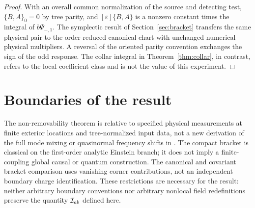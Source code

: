 \documentclass[11pt]{article}
\newcommand{\eps}{\varepsilon}
\begin{document}
\begin{proof}
With an overall common normalization of the source and detecting test, \(\{B,A\}_0=0\) by tree parity, and \([\eps]\{B,A\}\) is a nonzero constant times the integral of \(b\Psi_{-,1}\). The symplectic result of Section~\ref{sec:bracket} transfers the same physical pair to the order-reduced canonical chart with unchanged numerical physical multipliers. A reversal of the oriented parity convention exchanges the sign of the odd response. The collar integral in Theorem~\ref{thm:collar}, in contrast, refers to the local coefficient class and is not the value of this experiment.
\end{proof}

\section{Boundaries of the result}

The non-removability theorem is relative to specified physical measurements at finite exterior locations and tree-normalized input data, not a new derivation of the full mode mixing or quasinormal frequency shifts in \cite{Cano}. The compact bracket is classical on the first-order analytic Einstein branch; it does not imply a finite-coupling global causal or quantum construction. The canonical and covariant bracket comparison uses vanishing corner contributions, not an independent boundary charge identification. These restrictions are necessary for the result: neither arbitrary boundary conventions nor arbitrary nonlocal field redefinitions preserve the quantity \({\cal I}_{ab}\) defined here.
\end{document}
